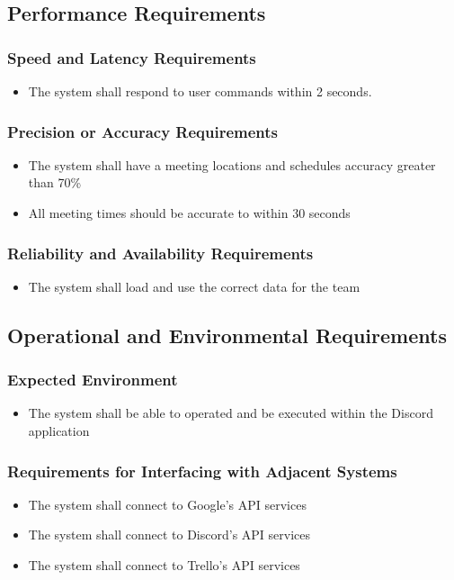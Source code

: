 \documentclass[12pt, titlepage]{article}
\begin{document}
\subsection{Performance Requirements}
\subsubsection{Speed and Latency Requirements}
\begin{itemize}
    \item The system shall respond to user commands within 2 seconds.
\end{itemize}
\subsubsection{Precision or Accuracy Requirements}
\begin{itemize}
    \item The system shall have a meeting locations and schedules accuracy greater than 70\%
    \item All meeting times should be accurate to within 30 seconds
\end{itemize}
\subsubsection{Reliability and Availability Requirements}
\begin{itemize}
    \item The system shall load and use the correct data for the team
\end{itemize}

\subsection{Operational and Environmental Requirements}
\subsubsection{Expected Environment}
\begin{itemize}
    \item The system shall be able to operated and be executed within the Discord application
\end{itemize}
\subsubsection{Requirements for Interfacing with Adjacent Systems}
\begin{itemize}
    \item The system shall connect to Google's API services
    \item The system shall connect to Discord's API services
    \item The system shall connect to Trello's API services
\end{itemize}
\end{document}
